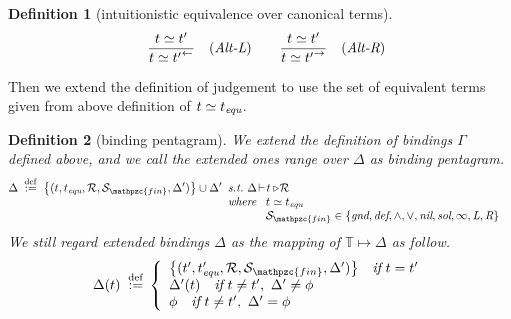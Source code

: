 \documentclass[12pt]{article}
\newtheorem{Definition}{Definition}[section]
\begin{document}
\begin{Definition}[intuitionistic equivalence over canonical terms]
\begin{displaymath}
\begin{array}{c}
\begin{array}{rll}
        & \begin{array}{rl}
            \dfrac{
              t \simeq t'
            }{
              t \simeq {t'}^\leftarrow
            }  &  (\text{\it Alt-L})
          \end{array}
        
        & \begin{array}{rl}
            \dfrac{
              t \simeq t'
            }{
              t \simeq {t'}^\rightarrow
            }  &  (\text{\it Alt-R})
          \end{array}
      \end{array}
      
    \end{array}
  \end{displaymath}
\end{Definition}


\vspace{\baselineskip}
Then we extend the definition of judgement to use the set of equivalent
terms given from above definition of $t \simeq t_{\text{\it equ}}$.

\begin{Definition}[binding pentagram]
  We extend the definition of bindings $\Gamma$ defined above,
  and we call the extended ones range over $\Delta$  as binding pentagram.
  \begin{displaymath}
    \Delta \;\stackrel{\mathrm{def}}{:=}\;
     \bigl\{(t, t_{\text{\it equ}}, \mathcal{R},
      \mathcal{S}_{\mathpzc{fin}}, \Delta') \bigr\} \cup \Delta'
      \begin{array}[t]{l}
        \text{\it s.t.}\ \Delta \!\vdash\! t \triangleright \!\mathcal{R} \\
        \text{\it where}\ \begin{array}[t]{l}
         t \simeq t_{\text{\it equ}}  \\
        \mathcal{S}_{\mathpzc{fin}}\in \{\text{\it gnd},
         \text{\it def}, \wedge, \vee, \text{\it nil}, \text{\it sol},
          \infty, \text{\it L}, \text{\it R}\}
        \end{array}
      \end{array}
  \end{displaymath}
  We still regard extended bindings $\Delta$ as the mapping of
  $\mathbb{T} \mapsto \Delta$ as follow.
  \begin{displaymath}
    \Delta(t) \;\stackrel{\mathrm{def}}{:=} \,\left\{\begin{array}{l}
      \bigl\{(t', t'_{\text{\it equ}}, \mathcal{R},
      \mathcal{S}_{\mathpzc{fin}}, \Delta') \bigr\}
       \quad \text{\it if}\ t = t'  \\
      \Delta'(t) \quad \text{\it if}\ t \neq t',\ \Delta' \neq \phi  \\
       \phi \quad \text{\it if}\ t \neq t',\ \Delta' = \phi
    \end{array}\right.
  \end{displaymath}  
\end{Definition}
\end{document}

